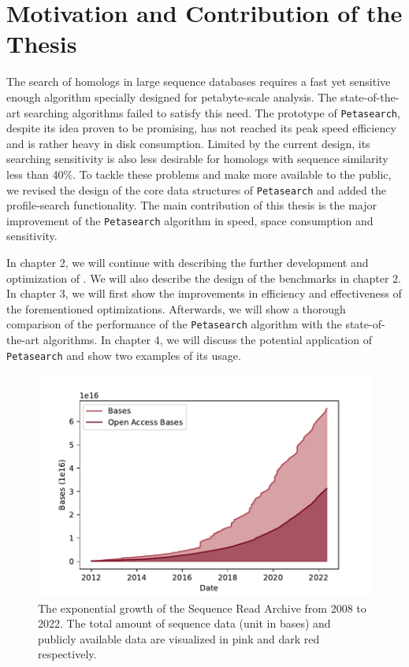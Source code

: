 \section{Motivation and Contribution of the Thesis}

The search of homologs in large sequence databases requires a fast yet sensitive enough algorithm specially designed for petabyte-scale analysis. The state-of-the-art searching algorithms failed to satisfy this need. The prototype of \texttt{Petasearch}, despite its idea proven to be promising, has not reached its peak speed efficiency and is rather heavy in disk consumption. Limited by the current design, its searching sensitivity is also less desirable for homologs with sequence similarity less than 40\%. To tackle these problems and make  more available to the public, we revised the design of the core data structures of \texttt{Petasearch} and added the profile-search functionality. The main contribution of this thesis is the major improvement of the \texttt{Petasearch} algorithm in speed, space consumption and sensitivity.

In chapter 2, we will continue with describing the further development and optimization of . We will also describe the design of the benchmarks in chapter 2. In chapter 3, we will first show the improvements in efficiency and effectiveness of the forementioned optimizations. Afterwards, we will show a thorough comparison of the performance of the \texttt{Petasearch} algorithm with the state-of-the-art algorithms. In chapter 4, we will discuss the potential application of \texttt{Petasearch} and show two examples of its usage.

\pagebreak

\thispagestyle{empty}
\begin{figure}[t]
  \centering
  \includegraphics[width=\textwidth]{images/sra_stat.pdf}
  \caption{The exponential growth of the Sequence Read Archive from 2008 to 2022. The total amount of sequence data (unit in bases) and publicly available data are visualized in pink and dark red respectively.}
  \label{fig:sra_stat}
\end{figure}
